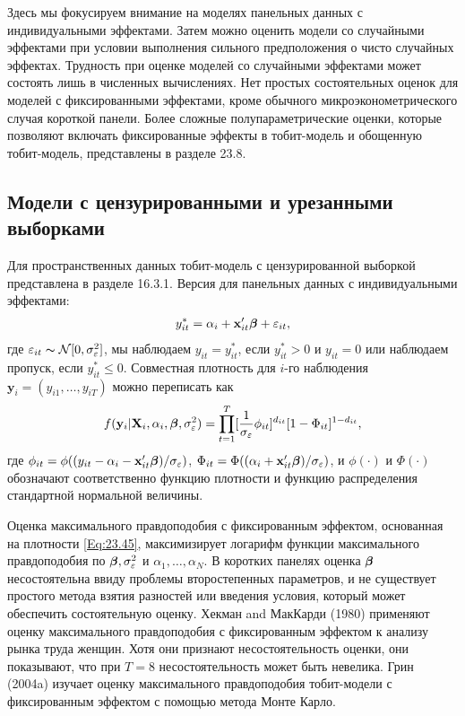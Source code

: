 Здесь мы фокусируем внимание на моделях панельных данных с индивидуальными эффектами. Затем можно оценить модели со случайными эффектами при условии выполнения сильного предположения о чисто случайных эффектах. Трудность при оценке моделей со случайными эффектами может состоять лишь в численных вычислениях. Нет простых состоятельных оценок для моделей с фиксированными эффектами, кроме  обычного микроэконометрического случая короткой панели. Более сложные полупараметрические оценки, которые позволяют включать фиксированные эффекты в тобит-модель и обощенную тобит-модель, представлены в разделе 23.8.

\subsection{Модели с цензурированными и урезанными выборками}

Для пространственных данных тобит-модель с цензурированной выборкой представлена в разделе 16.3.1. Версия для панельных данных с индивидуальными эффектами:
\begin{align}
y^*_{it}=\alpha_i+\mathbf{x}'_{it}\bm{\beta}+\varepsilon_{it},
\label{Eq:23.44}
\end{align}
где $\varepsilon_{it} \thicksim \mathcal{N}[0,\sigma^2_{\varepsilon}]$, мы наблюдаем $y_{it}=y^*_{it}$, если $y^*_{it} > 0$ и $y_{it}=0$ или наблюдаем пропуск, если $y^*_{it} \leq 0$. Совместная плотность для $i$-го наблюдения $\mathbf{y}_i=(y_{i1}, \dots, y_{iT})$ можно переписать как
\begin{align}
f(\mathbf{y}_i| \mathbf{X}_i, \alpha_i, \bm{\beta}, \sigma^2_{\varepsilon})=\prod^T_{t=1} [\frac{1}{\sigma_{\varepsilon}} \phi_{it}]^{d_{it}} [1-\Phi_{it}]^{1-d_{it}},
\label{Eq:23.45}
\end{align}
где $\phi_{it}=\phi((y_{it}-\alpha_i-\mathbf{x}'_{it}\bm{\beta})/\sigma_{\varepsilon})$, $\Phi_{it}=\Phi ((\alpha_i+\mathbf{x}'_{it}\bm{\beta})/\sigma_{\varepsilon})$, и $\phi(\cdot)$ и $\Phi(\cdot)$ обозначают соответственно функцию плотности и функцию распределения стандартной нормальной величины.

Оценка максимального правдоподобия с фиксированным эффектом, основанная на плотности \ref{Eq:23.45}, максимизирует логарифм функции максимального правдоподобия по $\bm{\beta}, \sigma^2_{\varepsilon}$ и $\alpha_1, \dots, \alpha_N$. В коротких панелях оценка $\bm{\beta}$ несостоятельна ввиду проблемы второстепенных параметров, и не существует  простого метода взятия разностей или введения условия, который может обеспечить состоятельную оценку. Хекман and МакКарди (1980) применяют оценку максимального правдоподобия с фиксированным эффектом к анализу рынка труда женщин. Хотя они признают несостоятельность оценки, они показывают, что при $T=8$ несостоятельность может быть невелика. Грин (2004a) изучает оценку максимального правдоподобия тобит-модели с фиксированным эффектом с помощью метода Монте Карло.

